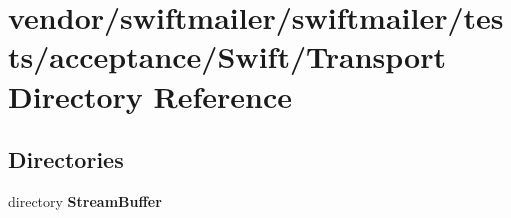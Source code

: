 \section{vendor/swiftmailer/swiftmailer/tests/acceptance/\+Swift/\+Transport Directory Reference}
\label{dir_8b24890dcf754286a28f9c2de7b25bfb}
\subsection*{Directories}
\begin{DoxyCompactItemize}
\item 
directory {\bf Stream\+Buffer}
\end{DoxyCompactItemize}
